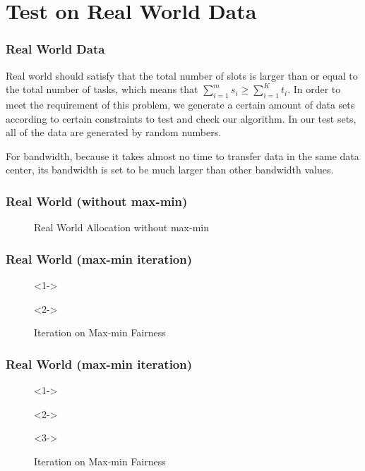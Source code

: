 \section{Test on Real World Data}

\begin{frame}
\frametitle{Real World Data}
    Real world should satisfy that the total number of slots is larger than or equal to the total number of tasks, which means that $\sum_{i=1}^m s_i\geq \sum_{i=1}^K t_i$. In order to meet the requirement of this problem, we generate a certain amount of data sets according to certain constraints to test and check our algorithm. In our test sets, all of the data are generated by random numbers.
    
    For bandwidth, because it takes almost no time to transfer data in the same data center, its bandwidth is set to be much larger than other bandwidth values.
\end{frame}

\begin{frame}
\frametitle{Real World (without max-min)}
    \begin{figure}
        \centering
        
        \caption{Real World Allocation without max-min}
    \end{figure}
\end{frame}

\begin{frame}
\frametitle{Real World (max-min iteration)}
    \begin{figure}[h]
        \centering
        \begin{actionenv}<1->
            
        \end{actionenv}
        \begin{actionenv}<2->
            
        \end{actionenv}
        \caption{Iteration on Max-min Fairness}
    \end{figure}
\end{frame}

\begin{frame}
\frametitle{Real World (max-min iteration)}
    \begin{figure}[h]
        \centering
        \begin{actionenv}<1->
            
        \end{actionenv}
        \begin{actionenv}<2->
            
        \end{actionenv}
        \begin{actionenv}<3->
            
        \end{actionenv}
        \caption{Iteration on Max-min Fairness}
    \end{figure}
\end{frame}

